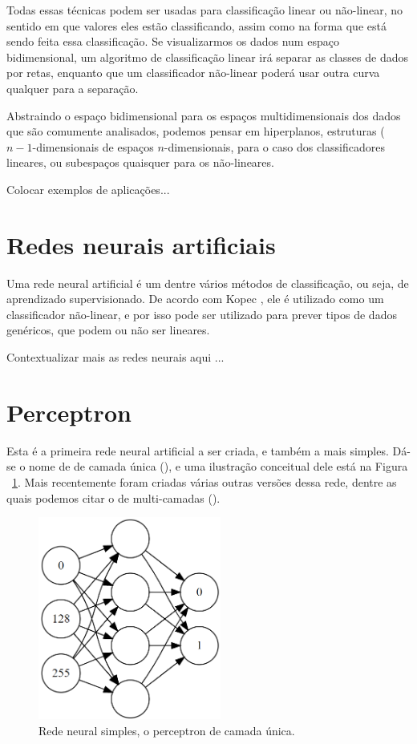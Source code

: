 Todas essas técnicas podem ser usadas para classificação linear ou não-linear, no sentido em que valores eles estão classificando, assim como na forma que está sendo feita essa classificação. Se visualizarmos os dados num espaço bidimensional, um algoritmo de classificação linear irá separar as classes de dados por retas, enquanto que um classificador não-linear poderá usar outra curva qualquer para a separação. 

Abstraindo o espaço bidimensional para os espaços multidimensionais dos dados que são comumente analisados, podemos pensar em hiperplanos, estruturas ($n{-}1$-dimensionais de espaços $n$-dimensionais, para o caso dos classificadores lineares, ou subespaços quaisquer para os não-lineares.

Colocar exemplos de aplicações...

\section{Redes neurais artificiais}

Uma rede neural artificial é um dentre vários métodos de classificação, ou seja, de aprendizado supervisionado. De acordo com Kopec \citep{classic}, ele é utilizado como um classificador não-linear, e por isso pode ser utilizado para prever tipos de dados genéricos, que podem ou não ser lineares.

Contextualizar mais as redes neurais aqui ...

\section{Perceptron}

Esta é a primeira rede neural artificial a ser criada, e também a mais simples. Dá-se o nome de  de camada única (), e uma ilustração conceitual dele está na Figura ~\ref{fig:perceptron}. Mais recentemente foram criadas várias outras versões dessa rede, dentre as quais podemos citar o  de multi-camadas (). 

\begin{figure}[htb]
\centering
\includegraphics[width=6cm]{figuras/perceptron}
\caption{\label{fig:perceptron}Rede neural simples, o perceptron de camada única.}
\end{figure}

